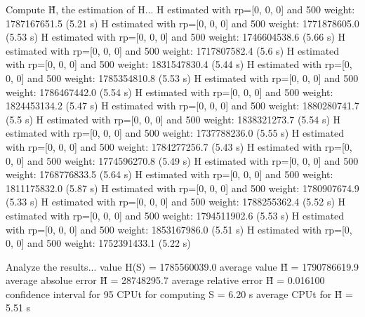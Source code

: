 Compute H̃, the estimation of H...
  H estimated with rp=[0, 0, 0] and 500 weight:  1787167651.5  (5.21 s)
  H estimated with rp=[0, 0, 0] and 500 weight:  1771878605.0  (5.53 s)
  H estimated with rp=[0, 0, 0] and 500 weight:  1746604538.6  (5.66 s)
  H estimated with rp=[0, 0, 0] and 500 weight:  1717807582.4  (5.6 s)
  H estimated with rp=[0, 0, 0] and 500 weight:  1831547830.4  (5.44 s)
  H estimated with rp=[0, 0, 0] and 500 weight:  1785354810.8  (5.53 s)
  H estimated with rp=[0, 0, 0] and 500 weight:  1786467442.0  (5.54 s)
  H estimated with rp=[0, 0, 0] and 500 weight:  1824453134.2  (5.47 s)
  H estimated with rp=[0, 0, 0] and 500 weight:  1880280741.7  (5.5 s)
  H estimated with rp=[0, 0, 0] and 500 weight:  1838321273.7  (5.54 s)
  H estimated with rp=[0, 0, 0] and 500 weight:  1737788236.0  (5.55 s)
  H estimated with rp=[0, 0, 0] and 500 weight:  1784277256.7  (5.43 s)
  H estimated with rp=[0, 0, 0] and 500 weight:  1774596270.8  (5.49 s)
  H estimated with rp=[0, 0, 0] and 500 weight:  1768776833.5  (5.64 s)
  H estimated with rp=[0, 0, 0] and 500 weight:  1811175832.0  (5.87 s)
  H estimated with rp=[0, 0, 0] and 500 weight:  1780907674.9  (5.33 s)
  H estimated with rp=[0, 0, 0] and 500 weight:  1788255362.4  (5.52 s)
  H estimated with rp=[0, 0, 0] and 500 weight:  1794511902.6  (5.53 s)
  H estimated with rp=[0, 0, 0] and 500 weight:  1853167986.0  (5.51 s)
  H estimated with rp=[0, 0, 0] and 500 weight:  1752391433.1  (5.22 s)

Analyze the results...
  value H(S)                  = 1785560039.0 
  average value H̃             = 1790786619.9 
  average absolue error H̃     = 28748295.7 
  average relative error H̃    = 0.016100 
  confidence interval for 95%
  CPUt for computing S         = 6.20 s
  average CPUt for H̃           = 5.51 s

